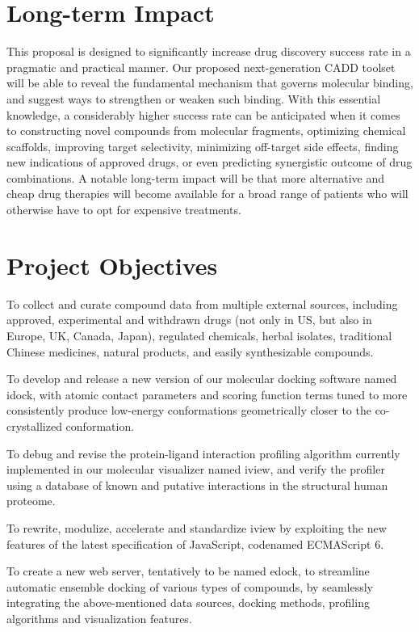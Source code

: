 \documentclass[a4paper,12pt]{article}
\begin{document}
\section*{Long-term Impact}

This proposal is designed to significantly increase drug discovery success rate in a pragmatic and practical manner. Our proposed next-generation CADD toolset will be able to reveal the fundamental mechanism that governs molecular binding, and suggest ways to strengthen or weaken such binding. With this essential knowledge, a considerably higher success rate can be anticipated when it comes to constructing novel compounds from molecular fragments, optimizing chemical scaffolds, improving target selectivity, minimizing off-target side effects, finding new indications of approved drugs, or even predicting synergistic outcome of drug combinations. A notable long-term impact will be that more alternative and cheap drug therapies will become available for a broad range of patients who will otherwise have to opt for expensive treatments.

\section*{Project Objectives}

To collect and curate compound data from multiple external sources, including approved, experimental and withdrawn drugs (not only in US, but also in Europe, UK, Canada, Japan), regulated chemicals, herbal isolates, traditional Chinese medicines, natural products, and easily synthesizable compounds.

To develop and release a new version of our molecular docking software named idock, with atomic contact parameters and scoring function terms tuned to more consistently produce low-energy conformations geometrically closer to the co-crystallized conformation.

To debug and revise the protein-ligand interaction profiling algorithm currently implemented in our molecular visualizer named iview, and verify the profiler using a database of known and putative interactions in the structural human proteome.

To rewrite, modulize, accelerate and standardize iview by exploiting the new features of the latest specification of JavaScript, codenamed ECMAScript 6.

To create a new web server, tentatively to be named edock, to streamline automatic ensemble docking of various types of compounds, by seamlessly integrating the above-mentioned data sources, docking methods, profiling algorithms and visualization features.
\end{document}

